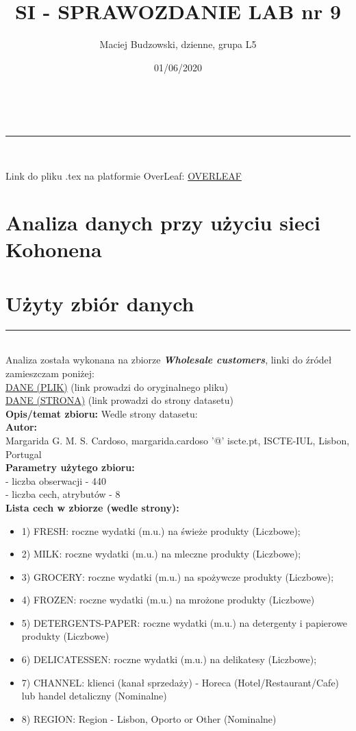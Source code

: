\documentclass[a4paper,12pt]{article}
\makeatletter
\newcommand{\linia}{\rule{\linewidth}{0.5pt}}
\theoremstyle{mytheor}
\renewcommand{\maketitle}{
\begin{center}
\vspace{2ex}
{\huge \textsc{\@title}}
\vspace{1ex}
\\
\linia\\
\@author \hfill \@date
\vspace{4ex}
\end{center}
}
\makeatother
\begin{document}
\title{SI - SPRAWOZDANIE LAB nr 9}

\author{Maciej Budzowski, dzienne, grupa L5}

\date{01/06/2020}

\maketitle
Link do pliku .tex na platformie OverLeaf: \textcolor{red}{\href{https://www.overleaf.com/read/gtjhbdddtygc}{OVERLEAF}}

\section*{Analiza danych przy użyciu sieci Kohonena}

\section*{Użyty zbiór danych}
\linia\\

Analiza została wykonana na zbiorze \textbf{\emph{Wholesale customers}}, linki do źródeł zamieszczam poniżej:\\
\textcolor{red}{\href{https://archive.ics.uci.edu/ml/machine-learning-databases/00292/Wholesale\%20customers\%20data.csv}{DANE (PLIK)}} (link prowadzi do oryginalnego pliku)\\
\textcolor{red}{\href{https://archive.ics.uci.edu/ml/datasets/Wholesale+customers}{DANE (STRONA)}} (link prowadzi do strony datasetu)\\

\textbf{Opis/temat zbioru:} Wedle strony datasetu: \\

\textbf{Autor:}\\
Margarida G. M. S. Cardoso, margarida.cardoso '@' iscte.pt, ISCTE-IUL, Lisbon, Portugal\\

\textbf{Parametry użytego zbioru:}\\
 - liczba obserwacji - 440\\
 - liczba cech, atrybutów - 8\\

\textbf{Lista cech w zbiorze (wedle strony):}
\begin{itemize}
  \item1) FRESH: roczne wydatki (m.u.) na świeże produkty (Liczbowe);
  \item2) MILK: roczne wydatki (m.u.) na mleczne produkty (Liczbowe);
  \item3) GROCERY: roczne wydatki (m.u.) na spożywcze produkty (Liczbowe);
  \item4) FROZEN: roczne wydatki (m.u.) na mrożone produkty (Liczbowe)
  \item5) DETERGENTS-PAPER: roczne wydatki (m.u.) na detergenty i papierowe produkty (Liczbowe)
  \item6) DELICATESSEN: roczne wydatki (m.u.) na delikatesy (Liczbowe);
  \item7) CHANNEL: klienci (kanał sprzedaży) - Horeca (Hotel/Restaurant/Cafe) lub handel detaliczny (Nominalne)
  \item8) REGION: Region - Lisbon, Oporto or Other (Nominalne) 
\end{itemize}
\end{document}
